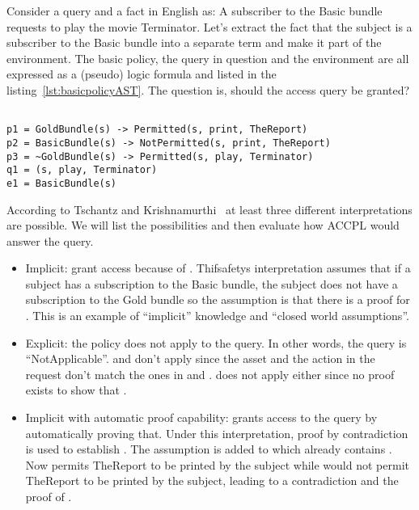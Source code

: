 Consider a query and a fact in English as: A subscriber to the Basic bundle requests to play the movie Terminator. Let's extract the fact that the subject is a subscriber to the Basic bundle into a separate term and make it part of the environment. The basic policy, the query in question and the environment are all expressed as a (pseudo) logic formula and listed in the listing~\ref{lst:basicpolicyAST}. The question is, should the access query be granted?

\lstset{mathescape, language=AST}  
\begin{lstlisting}[frame=single, caption={Basic Policy},label={lst:basicpolicyAST}]

p1 = GoldBundle(s) -> Permitted(s, print, TheReport) 
p2 = BasicBundle(s) -> NotPermitted(s, print, TheReport) 
p3 = ~GoldBundle(s) -> Permitted(s, play, Terminator)
q1 = (s, play, Terminator) 
e1 = BasicBundle(s)
\end{lstlisting}


According to Tschantz and Krishnamurthi~\cite{Tschantz} at least three different interpretations are possible. We will list the possibilities and then evaluate how \ac{ACCPL} would answer the query.

\begin{itemize}
\item Implicit: grant access because of . Thifsafetys interpretation assumes that if a subject has a subscription to the Basic bundle, the subject does not have a subscription to the Gold bundle so the assumption is that there is a proof for . This is an example of ``implicit'' knowledge and ``closed world assumptions''.

\item Explicit: the policy does not apply to the query. In other words, the query is ``NotApplicable''.  and  don't apply since the asset and the action in the request don't match the ones in  and .  does not apply either since no proof exists to show that . 

\item Implicit with automatic proof capability: grants access to the query by automatically proving that. Under this interpretation, proof by contradiction is used to establish .  The assumption  is added to  which already contains . Now  permits TheReport to be printed by the subject while  would not permit TheReport to be printed by the subject, leading to a contradiction and the proof of .
\end{itemize}


